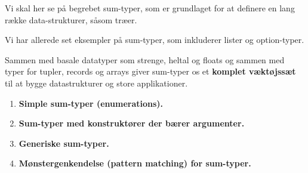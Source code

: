 \documentclass[rgb]{beamer}
\begin{document}
\popmaketitleframe


\begin{frame}[fragile]
\begin{footnotesize}


  \vspace{1ex}
  Vi skal her se på begrebet sum-typer, som er grundlaget for at
  definere en lang række data-strukturer, såsom træer.

  \vspace{1ex}

  Vi har allerede set eksempler på sum-typer, som inkluderer lister og
  option-typer.

  \vspace{1ex}

  Sammen med basale datatyper som strenge, heltal og floats og sammen
  med typer for tupler, records og arrays giver sum-typer os et
  \textbf{komplet væktøjssæt} til at bygge datastrukturer og store
  applikationer.

  \vspace{1ex}

\begin{minipage}[b]{0.6\textwidth}

  \begin{enumerate}
  \item \textbf{Simple sum-typer (enumerations).}

  \item \textbf{Sum-typer med konstruktører der bærer argumenter.}

  \item \textbf{Generiske sum-typer.}

  \item \textbf{Mønstergenkendelse (pattern matching) for sum-typer.}
  \end{enumerate}
\end{minipage} \hspace{5mm}
\begin{minipage}[b]{0.3\textwidth}


\end{minipage}
\end{footnotesize}
\end{frame}
\end{document}
